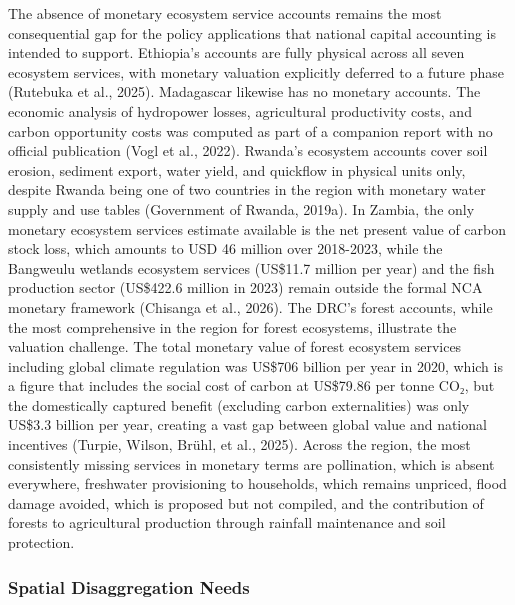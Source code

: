 \documentclass[
  letterpaper,
  DIV=11,
  numbers=noendperiod]{scrartcl}
\begin{document}
The absence of monetary ecosystem service accounts remains the most
consequential gap for the policy applications that national capital
accounting is intended to support. Ethiopia's accounts are fully
physical across all seven ecosystem services, with monetary valuation
explicitly deferred to a future phase (Rutebuka et al., 2025).
Madagascar likewise has no monetary accounts. The economic analysis of
hydropower losses, agricultural productivity costs, and carbon
opportunity costs was computed as part of a companion report with no
official publication (Vogl et al., 2022). Rwanda's ecosystem accounts
cover soil erosion, sediment export, water yield, and quickflow in
physical units only, despite Rwanda being one of two countries in the
region with monetary water supply and use tables (Government of Rwanda,
2019a). In Zambia, the only monetary ecosystem services estimate
available is the net present value of carbon stock loss, which amounts
to USD 46 million over 2018-2023, while the Bangweulu wetlands ecosystem
services (US\$11.7 million per year) and the fish production sector
(US\$422.6 million in 2023) remain outside the formal NCA monetary
framework (Chisanga et al., 2026). The DRC's forest accounts, while the
most comprehensive in the region for forest ecosystems, illustrate the
valuation challenge. The total monetary value of forest ecosystem
services including global climate regulation was US\$706 billion per
year in 2020, which is a figure that includes the social cost of carbon
at US\$79.86 per tonne CO₂, but the domestically captured benefit
(excluding carbon externalities) was only US\$3.3 billion per year,
creating a vast gap between global value and national incentives
(Turpie, Wilson, Brühl, et al., 2025). Across the region, the most
consistently missing services in monetary terms are pollination, which
is absent everywhere, freshwater provisioning to households, which
remains unpriced, flood damage avoided, which is proposed but not
compiled, and the contribution of forests to agricultural production
through rainfall maintenance and soil protection.

\subsubsection{Spatial Disaggregation
Needs}\label{spatial-disaggregation-needs}
\end{document}
